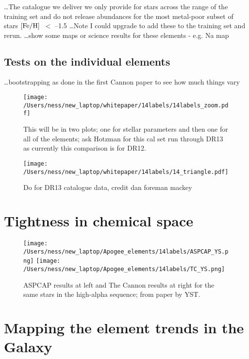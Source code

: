 \documentclass[12pt, preprint]{aastex}
\newcommand{\feh}{\mbox{$\rm [Fe/H]$}}
\begin{document}
\ldots The catalogue we deliver we only provide for stars across the range of the training set and do not release abundances for the most metal-poor subset of stars \feh\ $<$ --1.5
\ldots Note I could upgrade to add these to the training set and rerun.
\ldots show some maps or science results for these elements  - e.g. Na map 

\subsection{Tests on the individual elements}

\ldots bootstrapping as done in the first Cannon paper to see how much things vary



\begin{figure}
\flushleft
  \texttt{[image: /Users/ness/new\_laptop/whitepaper/14labels/14labels\_zoom.pdf]}
    \caption{ This will be in two plots; one for stellar parameters and then one for all of the elements; ask Hotzman for this cal set run through DR13 as currently this comparison is for DR12. }
\label{fig:cn}
\end{figure}



\begin{figure}
\flushleft
  \texttt{[image: /Users/ness/new\_laptop/whitepaper/14labels/14\_triangle.pdf]}
    \caption{Do for DR13 catalogue data, credit dan foreman mackey }
\label{fig:cn}
\end{figure}

\section{Tightness in chemical space}

\begin{figure}
\flushleft
  \texttt{[image: /Users/ness/new\_laptop/Apogee\_elements/14labels/ASPCAP\_YS.png]}
    \texttt{[image: /Users/ness/new\_laptop/Apogee\_elements/14labels/TC\_YS.png]}
    \caption{ASPCAP results at left and The Cannon results at right for the same stars in the high-alpha sequence; from paper by YST.}
\label{fig:cn}
\end{figure}

\section{Mapping the element trends in the Galaxy}
\end{document}
